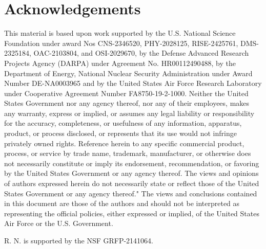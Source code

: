 \documentclass{amsart}
\numberwithin{equation}{section}
\begin{document}
\section*{Acknowledgements}

{\small  
This material is based upon work supported by the U.S. National Science Foundation under award Nos CNS-2346520, PHY-2028125, RISE-2425761, DMS-2325184, OAC-2103804, and OSI-2029670, by the Defense Advanced Research Projects Agency (DARPA) under Agreement No. HR00112490488, by the Department of Energy, National Nuclear Security Administration under Award Number DE-NA0003965 and by the United States Air Force Research Laboratory under Cooperative Agreement Number FA8750-19-2-1000. Neither the United States Government nor any agency thereof, nor any of their employees, makes any warranty, express or implied, or assumes any legal liability or responsibility for the accuracy, completeness, or usefulness of any information, apparatus, product, or process disclosed, or represents that its use would not infringe privately owned rights. Reference herein to any specific commercial product, process, or service by trade name, trademark, manufacturer, or otherwise does not necessarily constitute or imply its endorsement, recommendation, or favoring by the United States Government or any agency thereof. The views and opinions of authors expressed herein do not necessarily state or reflect those of the United States Government or any agency thereof." The views and conclusions contained in this document are those of the authors and should not be interpreted as representing the official policies, either expressed or implied, of the United States Air Force or the U.S. Government. 

\noindent R. N. is supported by the NSF GRFP-2141064. }




\end{document}
